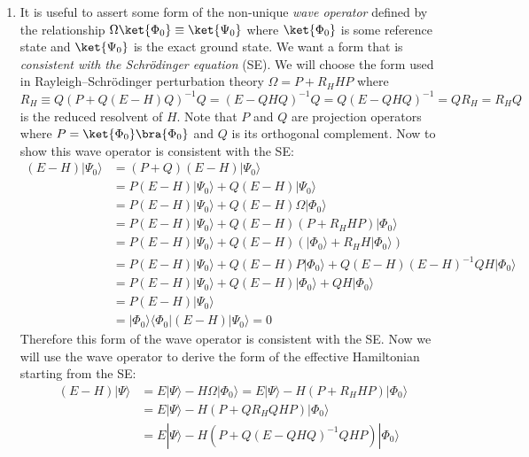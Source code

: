 \documentclass[fleqn, 12pt]{article}
\begin{document}
\begin{enumerate}
\item It is useful to assert some form of the non-unique \emph{wave operator}
  defined by the relationship $\Omega \ket{\Phi_0} \equiv \ket{\Psi_0}$ where
  $\ket{\Phi_0}$ is some reference state and $\ket{\Psi_0}$ is the exact
  ground state.  We want a form that is \emph{consistent with the
    Schr\"odinger equation} (SE).  We will choose the form used in
  Rayleigh--Schr\"odinger perturbation theory $\Omega = P + R_H H P$ where
  $R_{H} \equiv Q (P + Q (E - H) Q)^{-1} Q = (E - Q H Q)^{-1} Q = Q (E - Q H
  Q)^{-1} = Q R_{H} = R_{H} Q$
  is the reduced resolvent of $H$.  Note that $P$ and $Q$ are projection
  operators where $P = \ket{\Phi_0} \bra{\Phi_0}$ and $Q$ is its orthogonal
  complement.  Now to show this wave operator is consistent with the SE:
  \begin{align*}
    \left(E-H\right)|\Psi_{0}\rangle
    &=(P+Q)\left(E-H\right)|\Psi_{0}\rangle \\
    &=P\left(E-H\right)|\Psi_{0}\rangle+Q\left(E-H\right)|\Psi_{0}\rangle\\
    &=P\left(E-H\right)|\Psi_{0}\rangle+Q\left(E-H\right)\Omega|\Phi_{0}\rangle\\
    &=P\left(E-H\right)|\Psi_{0}\rangle+Q\left(E-H\right)\left(P+R_{H}HP\right)|\Phi_{0}\rangle\\
    &=P\left(E-H\right)|\Psi_{0}\rangle+Q\left(E-H\right)\left(|\Phi_{0}\rangle+R_{H}H|\Phi_{0}\rangle\right)\\
    &=P\left(E-H\right)|\Psi_{0}\rangle+Q\left(E-H\right)P|\Phi_{0}\rangle+Q\left(E-H\right)\left(E-H\right)^{-1}QH|\Phi_{0}\rangle\\
    &=P\left(E-H\right)|\Psi_{0}\rangle+Q\left(E-H\right)|\Phi_{0}\rangle+QH|\Phi_{0}\rangle\\
    &=P\left(E-H\right)|\Psi_{0}\rangle \\
    &=|\Phi_{0}\rangle\langle\Phi_{0}|\left(E-H\right)|\Psi_{0}\rangle=0
  \end{align*}
  Therefore this form of the wave operator is consistent with the SE.  Now we
  will use the wave operator to derive the form of the effective Hamiltonian
  starting from the SE:
  \begin{align*}
    \left(E-H\right)|\Psi\rangle
    &=E|\Psi\rangle-H\Omega|\Phi_{0}\rangle=E|\Psi\rangle-H\left(P+R_{H}HP\right)|\Phi_{0}\rangle \\
    &=E|\Psi\rangle-H\left(P+QR_{H}QHP\right)|\Phi_{0}\rangle\\
    &=E|\Psi\rangle-H\left(P+Q(E-QHQ)^{-1}QHP\right)|\Phi_{0}\rangle

\end{align*}
\end{enumerate}
\end{document}
